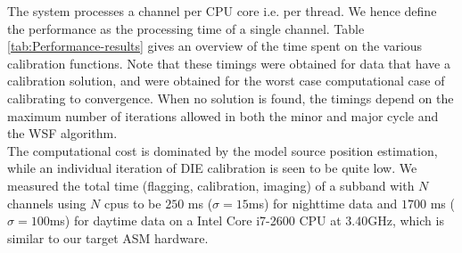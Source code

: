 \documentclass{aa}
\begin{document}
The system processes a channel per CPU core i.e. per thread. We hence define the
performance   as   the   processing   time   of   a   single   channel.    Table
\ref{tab:Performance-results} gives an overview of the time spent on the various
calibration functions. Note that these  timings were obtained for data that have
a calibration solution, and were  obtained for the worst case computational case
of calibrating to convergence. When no  solution is found, the timings depend on
the maximum number  of iterations allowed in both the minor  and major cycle and
the WSF  algorithm. \\ The computational  cost is dominated by  the model source
position estimation, while an individual iteration of DIE calibration is seen to
be quite low.  We measured the  total time (flagging, calibration, imaging) of a
subband with $N$  channels using $N$ cpus  to be $250$ ms ($\sigma  = 15$ms) for
nighttime data and  $1700$ ms ($\sigma = 100$ms) for daytime  data on a Intel
Core i7-2600 CPU at 3.40GHz, which is similar to our target ASM hardware.
\begin{table}[tbh]
\caption{Functional profile of real-time calibration and imaging code}
\label{tab:Performance-results}

\end{table}
\end{document}
